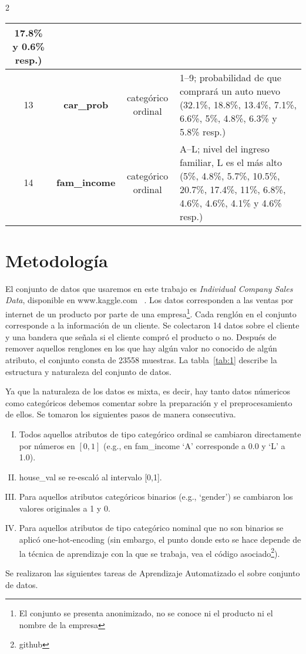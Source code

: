 \documentclass[letterpaper,11pt]{article}
\begin{document}
\begin{multicols}{2}
\begin{table*}[t]
\begin{center}
{\begin{tabular}{|c|c|c|p{10cm}|}
{    17.8\% y 0.6\% resp.)}\\
    \hline 
    13 &\bf car\_prob & categórico ordinal & 1--9; probabilidad de que comprará un auto nuevo {\footnotesize (32.1\%,
    18.8\%, 13.4\%, 7.1\%, 6.6\%, 5\%, 4.8\%, 6.3\% y 5.8\% resp.)}\\
    \hline 
    14 &\bf fam\_income & categórico ordinal & A--L; nivel del ingreso familiar, L es el más alto {\footnotesize (5\%,
    4.8\%, 5.7\%, 10.5\%, 20.7\%, 17.4\%, 11\%, 6.8\%, 4.6\%, 4.6\%, 4.1\% y 4.6\% resp.)}\\
    \hline
\end{tabular}}
\end{center}
\caption{\small La estructura de la base de datos.}
\label{tab:1}
\end{table*}

\section{Metodología}
El conjunto de datos que usaremos en este trabajo es \emph{Individual Company Sales Data}, disponible en www.kaggle.com~
\cite{kaggle}. Los datos corresponden a las ventas por internet de un producto por parte de una 
empresa\footnote{El conjunto se presenta anonimizado, no se conoce ni el producto ni el nombre de la empresa}. Cada
renglón en el conjunto corresponde a la información de un cliente.  Se colectaron 14 datos sobre el cliente y una bandera
que señala si el cliente compró el producto o no. Después de remover aquellos renglones en los que hay algún valor
no conocido de algún atributo, el conjunto consta de 23558 muestras. La tabla~\ref{tab:1} describe la estructura y 
naturaleza del conjunto de datos.

Ya que la naturaleza de los datos es mixta, es decir, hay tanto datos númericos como categóricos
debemos comentar sobre la preparación y el preprocesamiento de ellos. Se tomaron los siguientes pasos de manera
consecutiva. 

\begin{enumerate}[I.]
    \item Todos aquellos atributos de tipo categórico ordinal se cambiaron directamente por números en $[0,1]$
        (e.g., en fam\_income `A' corresponde a 0.0 y `L' a 1.0). 
    \item house\_val se re-escaló al intervalo [0,1]. 
    \item Para aquellos atributos categóricos binarios (e.g., `gender') se cambiaron los valores originales a 1 y 0. 
    \item Para aquellos atributos de tipo categórico nominal que no son binarios se aplicó one-hot-encoding (sin
            embargo, el punto donde esto se hace depende de la técnica de aprendizaje con la que se trabaja, vea el
        código asociado\footnote{github}). 
\end{enumerate}
Se realizaron las siguientes tareas de Aprendizaje Automatizado el sobre conjunto de datos.


\end{multicols}
\end{document}
